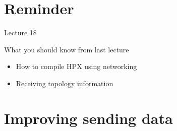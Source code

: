 \documentclass[\classoption]{beamer}
\title{\coursename}
\subtitle{Lecture 19: Distributed implementation of the heat equation II}
\author{\tiny Patrick Diehl \orcid{0000-0003-3922-8419}}
\date {
 \tiny \url{\courseurl}
\vspace{2cm}
\doclicenseThis  
  
}
\begin{document}
 {
    \frame {
        \titlepage
    }
}

\frame{

\tableofcontents

}


\section{Reminder}
\begin{frame}{Lecture 18}
\begin{block}{What you should know from last lecture}
\begin{itemize}
\item How to compile HPX using networking
\item Receiving topology information
\end{itemize}
\end{block}
\end{frame}

\section{Improving sending data}
\end{document}
